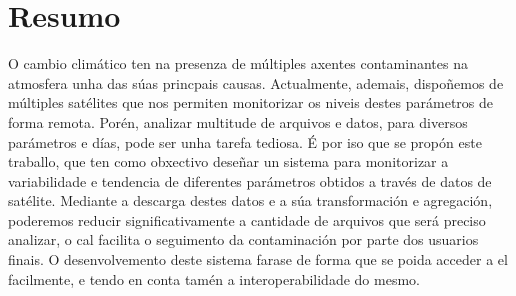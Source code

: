 \pagestyle{plain}
\chapter*{Resumo}
O cambio climático ten na presenza de múltiples axentes contaminantes na atmosfera unha das súas princpais causas. Actualmente, ademais, dispoñemos de múltiples satélites que nos permiten monitorizar
os niveis destes parámetros de forma remota. Porén, analizar multitude de arquivos e datos, para diversos parámetros e días, pode ser unha tarefa tediosa. É por iso que se propón este traballo, que
ten como obxectivo deseñar un sistema para monitorizar a variabilidade e tendencia de diferentes parámetros obtidos a través de datos de satélite. Mediante a descarga destes datos e a súa transformación
e agregación, poderemos reducir significativamente a cantidade de arquivos que será preciso analizar, o cal facilita o seguimento da contaminación por parte dos usuarios finais. O desenvolvemento deste
sistema farase de forma que se poida acceder a el facilmente, e tendo en conta tamén a interoperabilidade do mesmo.